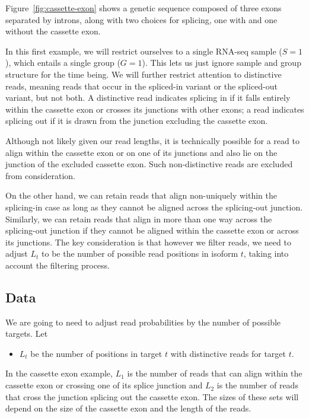 \documentclass[11pt]{report}
\begin{document}
Figure~\ref{fig:cassette-exon} shows a genetic sequence composed of
three exons separated by introns, along with two choices for splicing,
one with and one without the cassette exon.

In this first example, we will restrict ourselves to a single RNA-seq
sample ($S = 1$), which entails a single group ($G = 1$). This lets us
just ignore sample and group structure for the time being. We will
further restrict attention to distinctive reads, meaning reads that
occur in the spliced-in variant or the spliced-out variant, but not
both. A distinctive read indicates splicing in if it falls entirely
within the cassette exon or crosses its junctions with other exons; a
read indicates splicing out if it is drawn from the junction excluding
the cassette exon.

Although not likely given our read lengths, it is technically possible
for a read to align within the cassette exon or on one of its
junctions and also lie on the junction of the excluded cassette exon.
Such non-distinctive reads are excluded from consideration.

On the other hand, we can retain reads that align non-uniquely within
the splicing-in case as long as they cannot be aligned across the
splicing-out junction. Similarly, we can retain reads that align in
more than one way across the splicing-out junction if they cannot be
aligned within the cassette exon or across its junctions. The key
consideration is that however we filter reads, we need to adjust $L_t$
to be the number of possible read positions in isoform $t$, taking
into account the filtering process.

\subsection{Data}

We are going to need to adjust read probabilities by the number of
possible targets.  Let
%
\begin{itemize}
\item $L_t$ be the number of positions in target $t$ with distinctive
  reads for target $t$.
\end{itemize}
%
In the cassette exon example, $L_1$ is the number of reads that can
align within the cassette exon or crossing one of its splice junction
and $L_2$ is the number of reads that cross the junction splicing out
the cassette exon. The sizes of these sets will depend on the size of
the cassette exon and the length of the reads.
\end{document}
